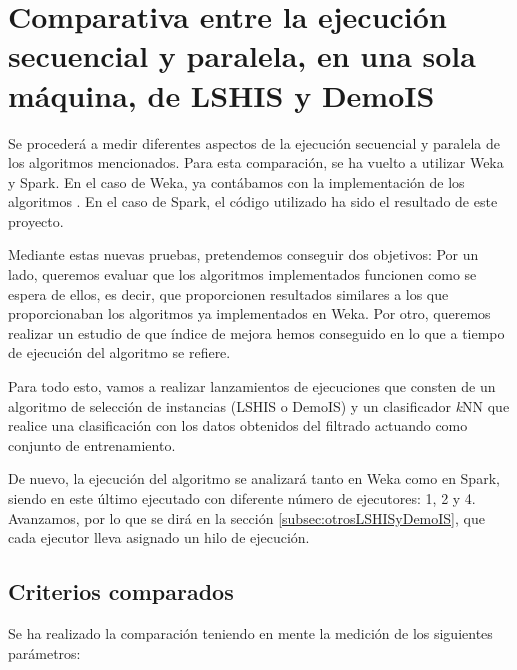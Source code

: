

\section{Comparativa entre la ejecución secuencial y paralela, en una sola máquina, de LSHIS y DemoIS}\label{sec:pruebasLSHISyDemoIS}

Se procederá a medir diferentes aspectos de la ejecución secuencial y paralela de los algoritmos mencionados. Para esta comparación, se ha vuelto a utilizar Weka y Spark. En el caso de Weka, ya contábamos con la implementación de los algoritmos \cite{arnaiz2012herramienta}. En el caso de Spark, el código utilizado ha sido el resultado de este proyecto.

Mediante estas nuevas pruebas, pretendemos conseguir dos objetivos: Por un lado, queremos evaluar que los algoritmos implementados funcionen como se espera de ellos, es decir, que proporcionen resultados similares a los que proporcionaban los algoritmos ya implementados en Weka. Por otro, queremos realizar un estudio de que índice de mejora hemos conseguido en lo que a tiempo de ejecución del algoritmo se refiere.

Para todo esto, vamos a realizar lanzamientos de ejecuciones que consten de un algoritmo de selección de instancias (LSHIS o DemoIS) y un clasificador \textit{k}NN que realice una clasificación con los datos obtenidos del filtrado actuando como conjunto de entrenamiento.

De nuevo, la ejecución del algoritmo se analizará tanto en Weka como en Spark, siendo en este último ejecutado con diferente número de ejecutores: 1, 2 y 4. Avanzamos, por lo que se dirá en la sección \ref{subsec:otrosLSHISyDemoIS}, que cada ejecutor lleva asignado un hilo de ejecución.

\subsection{Criterios comparados}

Se ha realizado la comparación teniendo en mente la medición de los siguientes parámetros:

